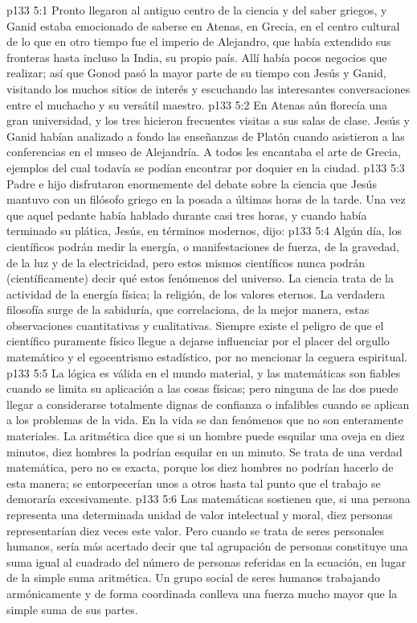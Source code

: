 \vs p133 5:1 Pronto llegaron al antiguo centro de la ciencia y del saber griegos, y Ganid estaba emocionado de saberse en Atenas, en Grecia, en el centro cultural de lo que en otro tiempo fue el imperio de Alejandro, que había extendido sus fronteras hasta incluso la India, su propio país. Allí había pocos negocios que realizar; así que Gonod pasó la mayor parte de su tiempo con Jesús y Ganid, visitando los muchos sitios de interés y escuchando las interesantes conversaciones entre el muchacho y su versátil maestro.
\vs p133 5:2 En Atenas aún florecía una gran universidad, y los tres hicieron frecuentes visitas a sus salas de clase. Jesús y Ganid habían analizado a fondo las enseñanzas de Platón cuando asistieron a las conferencias en el museo de Alejandría. A todos les encantaba el arte de Grecia, ejemplos del cual todavía se podían encontrar por doquier en la ciudad.
\vs p133 5:3 Padre e hijo disfrutaron enormemente del debate sobre la ciencia que Jesús mantuvo con un filósofo griego en la posada a últimas horas de la tarde. Una vez que aquel pedante había hablado durante casi tres horas, y cuando había terminado su plática, Jesús, en términos modernos, dijo:
\vs p133 5:4 \pc Algún día, los científicos podrán medir la energía, o manifestaciones de fuerza, de la gravedad, de la luz y de la electricidad, pero estos mismos científicos nunca podrán (científicamente) decir qué  estos fenómenos del universo. La ciencia trata de la actividad de la energía física; la religión, de los valores eternos. La verdadera filosofía surge de la sabiduría, que correlaciona, de la mejor manera, estas observaciones cuantitativas y cualitativas. Siempre existe el peligro de que el científico puramente físico llegue a dejarse influenciar por el placer del orgullo matemático y el egocentrismo estadístico, por no mencionar la ceguera espiritual.
\vs p133 5:5 La lógica es válida en el mundo material, y las matemáticas son fiables cuando se limita su aplicación a las cosas físicas; pero ninguna de las dos puede llegar a considerarse totalmente dignas de confianza o infalibles cuando se aplican a los problemas de la vida. En la vida se dan fenómenos que no son enteramente materiales. La aritmética dice que si un hombre puede esquilar una oveja en diez minutos, diez hombres la podrían esquilar en un minuto. Se trata de una verdad matemática, pero no es exacta, porque los diez hombres no podrían hacerlo de esta manera; se entorpecerían unos a otros hasta tal punto que el trabajo se demoraría excesivamente.
\vs p133 5:6 Las matemáticas sostienen que, si una persona representa una determinada unidad de valor intelectual y moral, diez personas representarían diez veces este valor. Pero cuando se trata de seres personales humanos, sería más acertado decir que tal agrupación de personas constituye una suma igual al cuadrado del número de personas referidas en la ecuación, en lugar de la simple suma aritmética. Un grupo social de seres humanos trabajando armónicamente y de forma coordinada conlleva una fuerza mucho mayor que la simple suma de sus partes.
